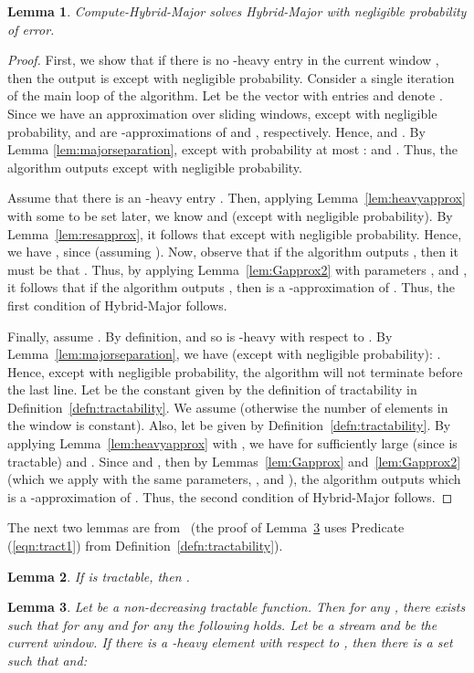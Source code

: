\documentclass[11pt]{article}
\newtheorem{lem}{Lemma}
\begin{document}
\begin{lem}\label{lem:hybridmajor}
Compute-Hybrid-Major solves Hybrid-Major with negligible probability of error.
\end{lem}
\begin{proof}

First, we show that if there is no -heavy entry in the current window , then the output
is  except with negligible probability.  Consider a single iteration of the main loop of the algorithm.
Let  be the vector with entries  and denote
.
Since we have an  approximation over sliding windows, except with negligible probability,  and  are -approximations
of  and , respectively.  Hence,  and .
By Lemma \ref{lem:majorseparation}, except with probability at most :
 and .
Thus, the algorithm outputs  except with negligible probability.

Assume that there is an -heavy entry .
Then, applying Lemma~\ref{lem:heavyapprox} with some  to be set later, we know
 and 
(except with negligible probability).
By Lemma~\ref{lem:resapprox},
it follows that  except with negligible probability.
Hence, we have , since
 (assuming ).
Now, observe that if the algorithm outputs , then it must be that
.
Thus, by applying Lemma~\ref{lem:Gapprox2} with parameters , and ,
it follows that if the algorithm outputs , then  is a -approximation of .
Thus, the first condition of Hybrid-Major follows.

Finally, assume . By definition,
 and so  is -heavy with respect to .
By Lemma~\ref{lem:majorseparation}, we have (except with negligible probability):
.
Hence, except with negligible probability, the algorithm will not terminate before the last line.
Let  be the constant given by the definition of
tractability in Definition~\ref{defn:tractability}.  We assume  (otherwise
the number of elements in the window is constant).  Also, let 
be given by Definition~\ref{defn:tractability}.
By applying Lemma~\ref{lem:heavyapprox} with , we have
 for sufficiently large  (since 
is tractable) and
.
Since 
and ,
then by Lemmas~\ref{lem:Gapprox} and~\ref{lem:Gapprox2} (which we apply with the same parameters,
, and ), the algorithm outputs  which is a -approximation
of .  Thus, the second condition of Hybrid-Major follows.
\end{proof}

\noindent
The next two lemmas are from~\cite{BO10} (the proof of Lemma~\ref{lem:G-major} uses Predicate (\ref{eqn:tract1})
from Definition~\ref{defn:tractability}).
\begin{lem}\label{lem:tractcube}
If  is tractable, then
.
\end{lem}
\begin{lem}\label{lem:G-major}
Let  be a non-decreasing tractable function. Then for any , there
exists  such that for any  and for any 
the following holds. Let  be a stream and  be the current window.
If there is a -heavy element  with respect to , then there is
a set  such that  and:

\end{lem}
\end{document}
